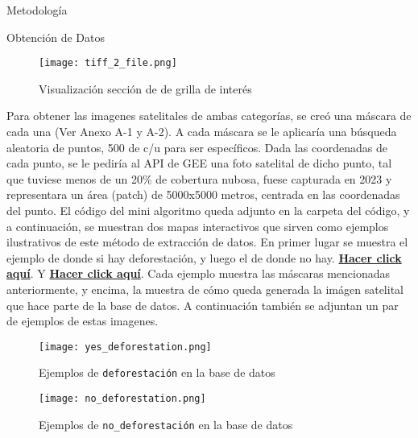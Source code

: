 \documentclass[11pt]{article}
\begin{document}
\begin{section}{Metodología}
\begin{subsection}{Obtención de Datos}
\begin{figure}[H]
    \centering
    \texttt{[image: tiff\_2\_file.png]}
    \caption{Visualización sección de de grilla de interés}
    \label{fig:imagename}
\end{figure}

Para obtener las imagenes satelitales de ambas categorías, se creó una máscara de cada una (Ver Anexo A-1 y A-2). A cada máscara se le aplicaría una búsqueda aleatoria de puntos, 500 de c/u para ser específicos. Dada las coordenadas de cada punto, se le pediría al API de GEE una foto satelital de dicho punto, tal que tuviese menos de un 20\% de cobertura nubosa, fuese capturada en 2023 y representara un área (patch) de 5000x5000 metros, centrada en las coordenadas del punto. El código del mini algoritmo queda adjunto en la carpeta del código, y a continuación, se muestran dos mapas interactivos que sirven como ejemplos ilustrativos de este método de extracción de datos. En primer lugar se muestra el ejemplo de donde si hay deforestación, y luego el de donde no hay. \textbf{\href{https://ee-thomaspradaes.projects.earthengine.app/view/ejemplodef}{Hacer click aquí}}. Y \textbf{\href{https://ee-thomaspradaes.projects.earthengine.app/view/ejemplonodef}{Hacer click aquí}}. Cada ejemplo muestra las máscaras mencionadas anteriormente, y encima, la muestra de cómo queda generada la imágen satelital que hace parte de la base de datos. A continuación también se adjuntan un par de ejemplos de estas imagenes. 

\begin{figure}[H]
    \centering
    \texttt{[image: yes\_deforestation.png]}
    \caption{Ejemplos de \texttt{deforestación} en la base de datos}
    \label{fig:imagename}
\end{figure}

\begin{figure}[H]
    \centering
    \texttt{[image: no\_deforestation.png]}
    \caption{Ejemplos de \texttt{no\_deforestación} en la base de datos}
    \label{fig:imagename}
\end{figure}


\end{subsection}
\end{section}
\end{document}
